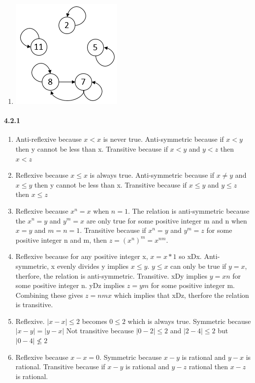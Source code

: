 \documentclass[11pt, letterpaper, twocolumn, fleqn]{article}
\begin{document}
\begin{enumerate}
            \item \includegraphics[scale=.7]{414d}
        \end{enumerate}
        
    \paragraph{4.2.1}
        \begin{enumerate}
            \item Anti-reflexive because $x < x$ is never true. 
                  Anti-symmetric because if $x < y$ then y cannot be less than x.
                  Transitive because if $x < y$ and $y < z$ then $x < z$
            \item Reflexive because $x \leq x$ is always true.
                  Anti-symmetric because if $x \neq y$ and $x \leq y$ then y cannot be less than x.
                  Transitive because if $x \leq y$ and $y \leq z$ then $x \leq z$
            \item Reflexive because $x^n = x$ when $n=1$.
                  The relation is anti-symmetric because the $x^n = y$ and $y^m = x$ are only true for some positive integer m and n when $x = y$ and $m=n=1$.
                  Transitive because if $x^n=y$ and $y^m=z$ for some positive integer n and m, then $z = (x^n)^m = x^{nm}$. 
            \item Reflexive because for any positive integer x, $x=x*1$ so xDx.
                  Anti-symmetric, x evenly divides y implies $x \leq y$. $y \leq x$ can only be true if $y=x$, therfore, the relation is anti-symmetric.
                  Transitive. xDy implies $y=xn$ for some positive integer n. yDz implies $z=ym$ for some positive integer m. Combining these gives $z=nmx$ which implies that xDz, therfore the relation is transitive.
            \item Reflexive. $|x-x| \leq 2$ becomes $0 \leq 2$ which is always true.
                  Symmetric because $|x-y| = |y-x|$
                  Not transitive because $|0-2| \leq 2$ and $|2-4| \leq 2$ but $|0-4| \nleq 2$
            \item Reflexive because $x-x=0$.
                  Symmetric because $x - y$ is rational and $y - x$ is rational.
                  Transitive because if $x-y$ is rational and $y-z$ rational then $x-z$ is rational.
        \end{enumerate}
    
\end{document}
